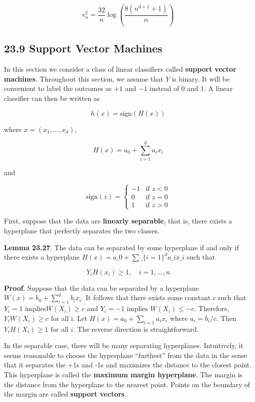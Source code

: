 \[ \epsilon_{n}^{2} = \frac{32}{n} \log \left( \frac{8 (n^{d + 1} + 1)}{\alpha} \right) \]

\subsection*{23.9 Support Vector Machines}\label{support-vector-machines}

In this section we consider a class of linear classifiers called
\textbf{support vector machines}. Throughout this section, we assume
that \(Y\) is binary. It will be convenient to label the outcomes as
\(+1\) and \(-1\) instead of \(0\) and \(1\). A linear classifier can
then be written as

\[ h(x) = \text{sign}( H(x) ) \]

where \(x = (x_{1}, \dots, x_d)\),

\[ H(x) = a_{0} + \sum_{i=1}^{d} a_{i} x_{i} \]

and

\[ \text{sign}(z) = \begin{cases}
-1 &\text{if } z < 0 \\
0  &\text{if } z = 0 \\
1  &\text{if } z > 0
\end{cases}\]

First, suppose that the data are \textbf{linearly separable}, that is,
there exists a hyperplane that perfectly separates the two classes.

\textbf{Lemma 23.27}. The data can be separated by some hyperplane if
and only if there exists a hyperplane $H(x) = a\_{0} + \sum\_\{i=1\}^{d}
a\_{i} x\_{i} $ such that

\[ Y_{i} H(x_{i}) \geq 1, \quad i = 1, \dots, n \]

\textbf{Proof}. Suppose that the data can be separated by a hyperplane
\(W(x) = b_{0} + \sum_{i=1}^{d} b_{i} x_{i}\). It follows that there exists some
constant \(c\) such that \(Y_{i} = 1\) implies\(W(X_{i}) \geq c\) and
\(Y_{i} = -1\) implies \(W(X_{i}) \leq -c\). Therefore,
\(Y_{i} W(X_{i}) \geq c\) for all i. Let \(H(x) = a_{0} + \sum_{i=1} a_{i} x_{i}\)
where \(a_{i} = b_{i} / c\). Then \(Y_{i} H(X_{i}) \geq 1\) for all \(i\). The
reverse direction is straightforward.

In the separable case, there will be many separating hyperplanes.
Intuitively, it seems reasonable to choose the hyperplane ``furthest''
from the data in the sense that it separates the +1s and -1s and
maximizes the distance to the closest point. This hyperplane is called
the \textbf{maximum margin hyperplane}. The margin is the distance from
the hyperplane to the nearest point. Points on the boundary of the
margin are called \textbf{support vectors}.

